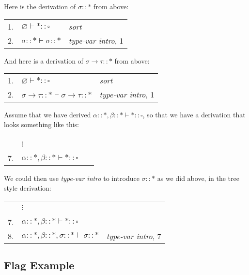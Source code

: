 \documentclass{book}
\numberwithin{equation}{chapter}
\begin{document}
\noindent
Here is the derivation of $\sigma :: \ast$ from above:

\begin{center}
\begin{tabular}[t]{l l l}
1. & $\varnothing \vdash \ast :: \square$ & \textit{sort} \\
2. & $\sigma :: \ast \vdash \sigma :: \ast$ & \textit{type-var intro}, 1
\end{tabular}
\end{center}

\noindent
And here is a derivation of $\sigma \rightarrow \tau :: \ast$ from above:

\begin{center}
\begin{tabular}[t]{l l l}
1. & $\varnothing \vdash \ast :: \square$ & \textit{sort} \\
2. & $\sigma \rightarrow \tau :: \ast \vdash \sigma \rightarrow \tau :: \ast$ & \textit{type-var intro}, 1
\end{tabular}
\end{center}


\noindent
Assume that we have derived $\alpha :: \ast, \beta :: \ast \vdash \ast :: \square$, so that we have a derivation that looks something like this:

\begin{center}
\begin{tabular}[t]{l l l}
~ & $\vdots$ & ~ \\
7. & $\alpha :: \ast, \beta :: \ast \vdash \ast :: \square$ & ~
\end{tabular}
\end{center}

\noindent
We could then use \textit{type-var intro} to introduce $\sigma :: \ast$ as we did above, in the tree style derivation:

\begin{center}
\begin{tabular}[t]{l l l}
~ & $\vdots$ & ~ \\
7. & $\alpha :: \ast, \beta :: \ast \vdash \ast :: \square$ & ~ \\
8. & $\alpha :: \ast, \beta :: \ast, \sigma :: \ast \vdash \sigma :: \ast$ & \textit{type-var intro}, 7
\end{tabular}
\end{center}



\subsection{Flag Example}
\end{document}
